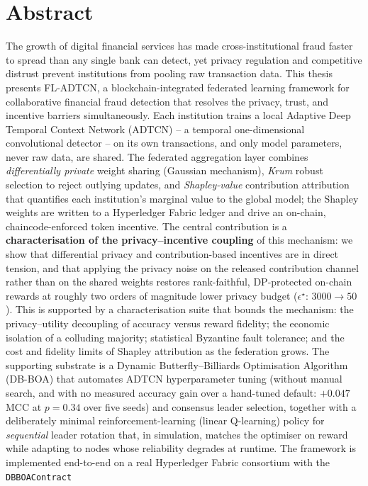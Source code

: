 \section*{Abstract}
The growth of digital financial services has made cross-institutional fraud faster to
spread than any single bank can detect, yet privacy regulation and competitive distrust
prevent institutions from pooling raw transaction data. This thesis presents FL-ADTCN, a
blockchain-integrated federated learning framework for collaborative financial fraud
detection that resolves the privacy, trust, and incentive barriers simultaneously. Each
institution trains a local Adaptive Deep Temporal Context Network (ADTCN) -- a temporal
one-dimensional convolutional detector -- on its own transactions, and only model
parameters, never raw data, are shared. The federated aggregation layer combines
\emph{differentially private} weight sharing (Gaussian mechanism), \emph{Krum} robust
selection to reject outlying updates, and \emph{Shapley-value} contribution attribution that
quantifies each institution's marginal value to the global model; the Shapley weights are
written to a Hyperledger Fabric ledger and drive an on-chain, chaincode-enforced token
incentive. The central contribution is a \textbf{characterisation of the
privacy--incentive coupling} of this mechanism: we show that differential privacy and
contribution-based incentives are in direct tension, and that applying the privacy noise on
the released contribution channel rather than on the shared weights restores rank-faithful,
DP-protected on-chain rewards at roughly two orders of magnitude lower privacy budget
($\epsilon^\star$: $3000\!\to\!50$). This is supported by a characterisation suite that bounds
the mechanism: the privacy--utility decoupling of accuracy versus reward fidelity; the economic
isolation of a colluding majority; statistical Byzantine fault tolerance; and the cost and
fidelity limits of Shapley attribution as the federation grows. The supporting substrate is a
Dynamic Butterfly--Billiards Optimisation Algorithm (DB-BOA) that automates ADTCN
hyperparameter tuning (without manual search, and with no measured accuracy gain over a hand-tuned default: $+0.047$ MCC at $p=0.34$ over five seeds) and
consensus leader selection, together with a deliberately minimal reinforcement-learning (linear
Q-learning) policy for \emph{sequential} leader rotation that, in simulation, matches the
optimiser on reward while adapting to nodes whose reliability degrades at runtime. The framework
is implemented end-to-end on a real Hyperledger Fabric consortium with the \texttt{DBBOAContract}
